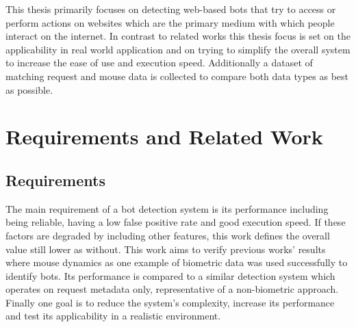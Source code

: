 \documentclass[
    fontsize=12pt,
    headings=small,
    parskip=half,           %
    bibliography=totoc,
    numbers=noenddot,       %
    open=any,               %
    final,                   %
    table
]{scrreprt}
\begin{document}
This thesis primarily focuses on detecting web-based bots that try to access or perform actions on websites which are the primary medium with which people interact on the internet. In contrast to related works this thesis focus is set on the applicability in real world application and on trying to simplify the overall system to increase the ease of use and execution speed. Additionally a dataset of matching request and mouse data is collected to compare both data types as best as possible.


\chapter{Requirements and Related Work}


\section{Requirements}

The main requirement of a bot detection system is its performance including being reliable, having a low false positive rate and good execution speed. If these factors are degraded by including other features, this work defines the overall value still lower as without. This work aims to verify previous works' results where mouse dynamics as one example of biometric data was used successfully to identify bots. Its performance is compared to a similar detection system which operates on request metadata only, representative of a non-biometric approach. Finally one goal is to reduce the system's complexity, increase its performance and test its applicability in a realistic environment.
\end{document}
